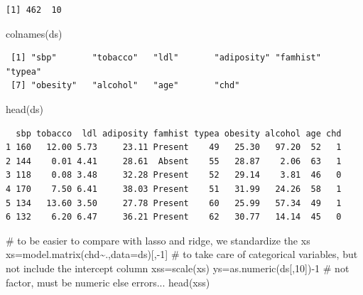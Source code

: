 \documentclass[
  letterpaper,
  DIV=11,
  numbers=noendperiod]{scrartcl}
\newenvironment{Shaded}{\begin{snugshade}}{\end{snugshade}}
\newcommand{\AttributeTok}[1]{\textcolor[rgb]{0.40,0.45,0.13}{#1}}
\newcommand{\CommentTok}[1]{\textcolor[rgb]{0.37,0.37,0.37}{#1}}
\newcommand{\DecValTok}[1]{\textcolor[rgb]{0.68,0.00,0.00}{#1}}
\newcommand{\FunctionTok}[1]{\textcolor[rgb]{0.28,0.35,0.67}{#1}}
\newcommand{\NormalTok}[1]{\textcolor[rgb]{0.00,0.23,0.31}{#1}}
\newcommand{\OtherTok}[1]{\textcolor[rgb]{0.00,0.23,0.31}{#1}}
\newcommand{\SpecialCharTok}[1]{\textcolor[rgb]{0.37,0.37,0.37}{#1}}
\begin{document}
\begin{verbatim}
[1] 462  10
\end{verbatim}

\begin{Shaded}
\begin{Highlighting}[]
\FunctionTok{colnames}\NormalTok{(ds)}
\end{Highlighting}
\end{Shaded}

\begin{verbatim}
 [1] "sbp"       "tobacco"   "ldl"       "adiposity" "famhist"   "typea"    
 [7] "obesity"   "alcohol"   "age"       "chd"      
\end{verbatim}

\begin{Shaded}
\begin{Highlighting}[]
\FunctionTok{head}\NormalTok{(ds)}
\end{Highlighting}
\end{Shaded}

\begin{verbatim}
  sbp tobacco  ldl adiposity famhist typea obesity alcohol age chd
1 160   12.00 5.73     23.11 Present    49   25.30   97.20  52   1
2 144    0.01 4.41     28.61  Absent    55   28.87    2.06  63   1
3 118    0.08 3.48     32.28 Present    52   29.14    3.81  46   0
4 170    7.50 6.41     38.03 Present    51   31.99   24.26  58   1
5 134   13.60 3.50     27.78 Present    60   25.99   57.34  49   1
6 132    6.20 6.47     36.21 Present    62   30.77   14.14  45   0
\end{verbatim}

\begin{Shaded}
\begin{Highlighting}[]
\CommentTok{\# to be easier to compare with lasso and ridge, we standardize the xs}
\NormalTok{xs}\OtherTok{=}\FunctionTok{model.matrix}\NormalTok{(chd}\SpecialCharTok{\textasciitilde{}}\NormalTok{.,}\AttributeTok{data=}\NormalTok{ds)[,}\SpecialCharTok{{-}}\DecValTok{1}\NormalTok{] }\CommentTok{\# to take care of categorical variables, but not include the intercept column}
\NormalTok{xss}\OtherTok{=}\FunctionTok{scale}\NormalTok{(xs)}
\NormalTok{ys}\OtherTok{=}\FunctionTok{as.numeric}\NormalTok{(ds[,}\DecValTok{10}\NormalTok{])}\SpecialCharTok{{-}}\DecValTok{1} \CommentTok{\# not factor, must be numeric else errors...}
\FunctionTok{head}\NormalTok{(xss)}
\end{Highlighting}
\end{Shaded}
\end{document}
